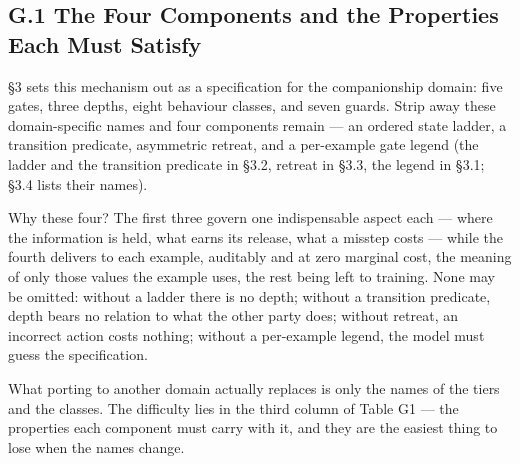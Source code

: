 \documentclass[letterpaper]{article}
\begin{document}
\subsection*{G.1 The Four Components and the Properties Each Must Satisfy}

\S{}3 sets this mechanism out as a specification for the companionship domain: five gates, three depths, eight behaviour classes, and seven guards. Strip away these domain-specific names and four components remain --- an ordered state ladder, a transition predicate, asymmetric retreat, and a per-example gate legend (the ladder and the transition predicate in \S{}3.2, retreat in \S{}3.3, the legend in \S{}3.1; \S{}3.4 lists their names).

Why these four? The first three govern one indispensable aspect each --- where the information is held, what earns its release, what a misstep costs --- while the fourth delivers to each example, auditably and at zero marginal cost, the meaning of only those values the example uses, the rest being left to training. None may be omitted: without a ladder there is no depth; without a transition predicate, depth bears no relation to what the other party does; without retreat, an incorrect action costs nothing; without a per-example legend, the model must guess the specification.

What porting to another domain actually replaces is only the names of the tiers and the classes. The difficulty lies in the third column of Table G1 --- the properties each component must carry with it, and they are the easiest thing to lose when the names change.
\end{document}

